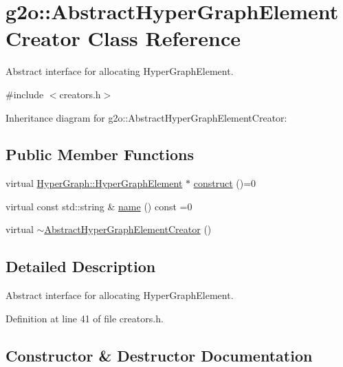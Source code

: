 \hypertarget{classg2o_1_1AbstractHyperGraphElementCreator}{}\section{g2o\+:\+:Abstract\+Hyper\+Graph\+Element\+Creator Class Reference}
\label{classg2o_1_1AbstractHyperGraphElementCreator}


Abstract interface for allocating Hyper\+Graph\+Element.  




{\ttfamily \#include $<$creators.\+h$>$}



Inheritance diagram for g2o\+:\+:Abstract\+Hyper\+Graph\+Element\+Creator\+:
\subsection*{Public Member Functions}
\begin{DoxyCompactItemize}
\item 
virtual \hyperlink{structg2o_1_1HyperGraph_1_1HyperGraphElement}{Hyper\+Graph\+::\+Hyper\+Graph\+Element} $\ast$ \hyperlink{classg2o_1_1AbstractHyperGraphElementCreator_a0b4722fa4b05465bf89d6e7fdc75b153}{construct} ()=0
\item 
virtual const std\+::string \& \hyperlink{classg2o_1_1AbstractHyperGraphElementCreator_a238928fbbfd6e473b2c61002112e6f5f}{name} () const =0
\item 
virtual \hyperlink{classg2o_1_1AbstractHyperGraphElementCreator_a7739f2b8d9e10f71c31d41748cf10835}{$\sim$\+Abstract\+Hyper\+Graph\+Element\+Creator} ()
\end{DoxyCompactItemize}


\subsection{Detailed Description}
Abstract interface for allocating Hyper\+Graph\+Element. 

Definition at line 41 of file creators.\+h.



\subsection{Constructor \& Destructor Documentation}
